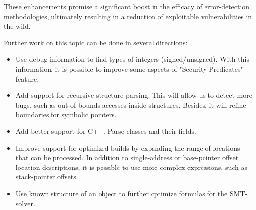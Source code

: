 \documentclass[conference]{IEEEtran}
\begin{document}
These enhancements promise a significant boost in the efficacy of error-detection methodologies, ultimately resulting in a reduction of exploitable vulnerabilities in the wild.

\vspace{0.2cm}

Further work on this topic can be done in several directions:

\begin{itemize}
    \item Use debug information to find types of integers (signed/unsigned). With this information, it is possible to improve some aspects of "Security Predicates" feature.
    \item Add support for recursive structure parsing. This will allow us to detect more bugs, such as out-of-bounds accesses inside structures. Besides, it will refine boundaries for symbolic pointers.
    \item Add better support for C++. Parse classes and their fields.
    \item Improve support for optimized builds by expanding the range of locations that can be processed. In addition to single-address or base-pointer offset location descriptions, it is possible to use more complex expressions, such as stack-pointer offsets.
    \item Use known structure of an object to further optimize formulas for the SMT-solver.
\end{itemize}







\end{document}
